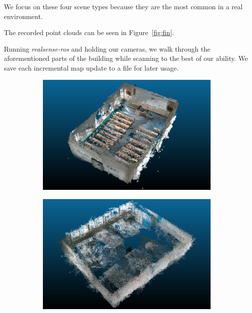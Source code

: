 \documentclass[main.tex]{subfiles}
\begin{document}
We focus on these four scene types because they are the most common in a real environment.

The recorded point clouds can be seen in Figure~\ref{fig:fin}.


Running \textit{realsense-ros} and holding our cameras, we walk through the aforementioned parts of the building while scanning to the best of our ability.
We save each incremental map update to a file for later usage.

\begin{figure}[H]
    \begin{subfigure}{0.5\textwidth}
        \centering
        \includegraphics[width=.9\linewidth]{images/307.png}
        \caption[Dynamic Dataset - auditorium]{}
        \label{fig:fin307}
    \end{subfigure}
    \begin{subfigure}{0.5\textwidth}
        \centering
        \includegraphics[width=.9\linewidth]{images/333.png}
        \caption[Dynamic Dataset - conference room]{}
        \label{fig:fin333}
    \end{subfigure}

\end{figure}
\end{document}
